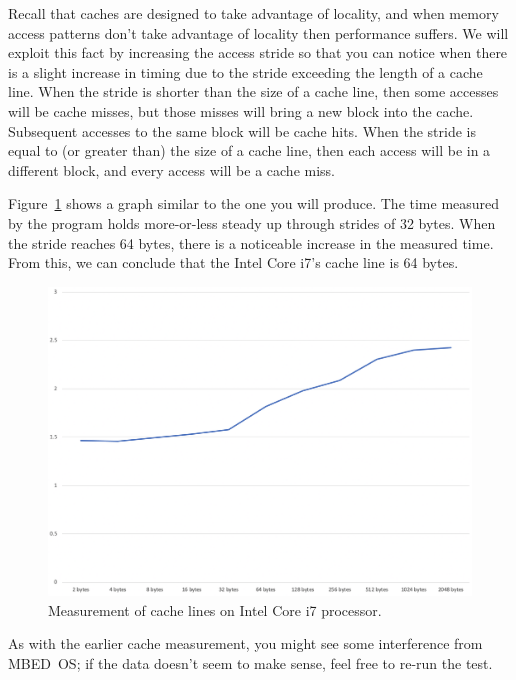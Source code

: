 Recall that caches are designed to take advantage of locality, and when memory access patterns don't take advantage of locality then performance suffers.
We will exploit this fact by increasing the access stride so that you can notice when there is a slight increase in timing due to the stride exceeding the length of a cache line.
When the stride is shorter than the size of a cache line, then some accesses will be cache misses, but those misses will bring a new block into the cache.
Subsequent accesses to the same block will be cache hits.
When the stride is equal to (or greater than) the size of a cache line, then each access will be in a different block,
and every access will be a cache miss.

Figure~\ref{fig:LaptopCacheLine} shows a graph similar to the one you will produce.
The time measured by the program holds more-or-less steady up through strides of 32 bytes.
When the stride reaches 64 bytes, there is a noticeable increase in the measured time.
From this, we can conclude that the Intel Core i7's cache line is 64 bytes.

\begin{figure}
    \centering
    \includegraphics[width=13cm]{IntelI7cacheLine}
    \caption{Measurement of cache lines on Intel Core i7 processor. \label{fig:LaptopCacheLine}}
\end{figure}

As with the earlier cache measurement, you might see some interference from MBED~OS;
if the data doesn't seem to make sense, feel free to re-run the test.

\begin{description}
\end{description}

